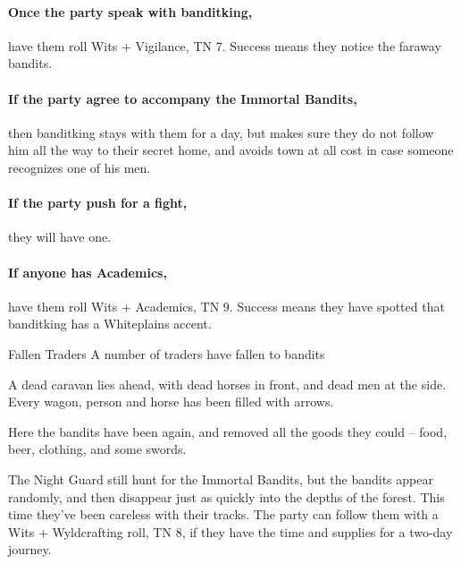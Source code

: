 \begin{multicols}{2}
\paragraph{Once the party speak with \gls{banditking},}
have them roll Wits + Vigilance, TN 7.
Success means they notice the faraway bandits.

\paragraph{If the party agree to accompany the Immortal Bandits,}
then \gls{banditking} stays with them for a day, but makes sure they do not follow him all the way to their secret home, and avoids town at all cost in case someone recognizes one of his men.

\paragraph{If the party push for a fight,}
they will have one.

\paragraph{If anyone has Academics,}
have them roll Wits + Academics, TN 9.
Success means they have spotted that \gls{banditking} has a Whiteplains accent.


\banditking


{Fallen Traders}%
{A number of traders have fallen to bandits}%

\begin{boxtext}

  A dead caravan lies ahead, with dead horses in front, and dead men at the side.  Every wagon, person and horse has been filled with arrows.

\end{boxtext}

Here the bandits have been again, and removed all the goods they could -- food, beer, clothing, and some swords.

The Night Guard still hunt for the Immortal Bandits, but the bandits appear randomly, and then disappear just as quickly into the depths of the forest.
This time they've been careless with their tracks.
The party can follow them with a Wits + Wyldcrafting roll, TN 8, if they have the time and supplies for a two-day journey.


\end{multicols}
